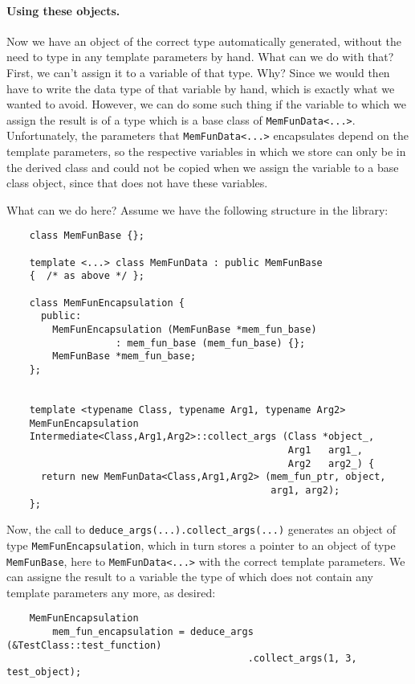 \documentclass[11pt]{article}
\begin{document}
\paragraph{Using these objects.} Now we have an object of the correct type
automatically generated, without the need to type in any template parameters
by hand. What can we do with that? First, we can't assign it to a variable of
that type. Why? Since we would then have to write the data type of that
variable by hand, which is exactly what we wanted to avoid. However, we can do
some such thing if the variable to which we assign the result is of a type
which is a base class of \texttt{MemFunData<...>}. Unfortunately, the
parameters that \texttt{MemFunData<...>} encapsulates depend on the
template parameters, so the respective variables in which we store can only be
in the derived class and could not be copied when we assign the variable to a
base class object, since that does not have these variables.

What can we do here? Assume we have the following structure in the library:
\begin{verbatim}
    class MemFunBase {};

    template <...> class MemFunData : public MemFunBase 
    {  /* as above */ };

    class MemFunEncapsulation {
      public:
        MemFunEncapsulation (MemFunBase *mem_fun_base)
                   : mem_fun_base (mem_fun_base) {};
        MemFunBase *mem_fun_base;
    };


    template <typename Class, typename Arg1, typename Arg2>
    MemFunEncapsulation
    Intermediate<Class,Arg1,Arg2>::collect_args (Class *object_,
                                                 Arg1   arg1_,
                                                 Arg2   arg2_) {
      return new MemFunData<Class,Arg1,Arg2> (mem_fun_ptr, object,
                                              arg1, arg2);
    };
\end{verbatim}

Now, the call to \texttt{deduce\_args(...).collect\_args(...)} generates an
object of type \texttt{MemFunEncapsulation}, which in turn stores a pointer to
an object of type \texttt{MemFunBase}, here to \texttt{MemFunData<...>} with
the correct template parameters. We can assigne the result to a variable the
type of which does not contain any template parameters any more, as desired:
\begin{verbatim}
    MemFunEncapsulation 
        mem_fun_encapsulation = deduce_args (&TestClass::test_function)
                                          .collect_args(1, 3, test_object);
\end{verbatim}
\end{document}
